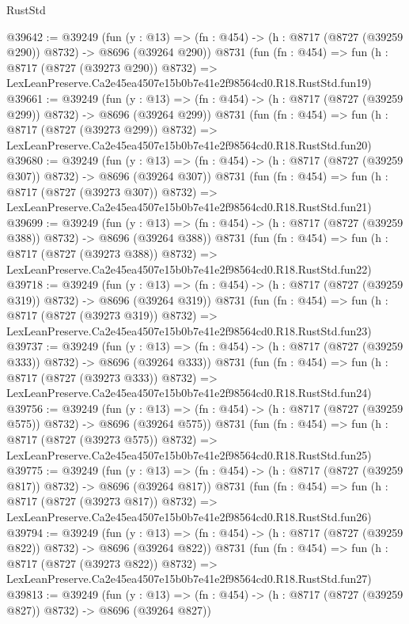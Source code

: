 \begin{lexlean}{RustStd}
\begin{coremodule}
@39642 := @39249
    (fun (y : @13) => (fn : @454) -> (h : @8717 (@8727 (@39259 @290)) @8732) -> @8696 (@39264 @290))
    @8731
    (fun (fn : @454) =>
    fun (h : @8717 (@8727 (@39273 @290)) @8732) =>
    LexLeanPreserve.Ca2e45ea4507e15b0b7e41e2f98564cd0.R18.RustStd.fun19)
@39661 := @39249
    (fun (y : @13) => (fn : @454) -> (h : @8717 (@8727 (@39259 @299)) @8732) -> @8696 (@39264 @299))
    @8731
    (fun (fn : @454) =>
    fun (h : @8717 (@8727 (@39273 @299)) @8732) =>
    LexLeanPreserve.Ca2e45ea4507e15b0b7e41e2f98564cd0.R18.RustStd.fun20)
@39680 := @39249
    (fun (y : @13) => (fn : @454) -> (h : @8717 (@8727 (@39259 @307)) @8732) -> @8696 (@39264 @307))
    @8731
    (fun (fn : @454) =>
    fun (h : @8717 (@8727 (@39273 @307)) @8732) =>
    LexLeanPreserve.Ca2e45ea4507e15b0b7e41e2f98564cd0.R18.RustStd.fun21)
@39699 := @39249
    (fun (y : @13) => (fn : @454) -> (h : @8717 (@8727 (@39259 @388)) @8732) -> @8696 (@39264 @388))
    @8731
    (fun (fn : @454) =>
    fun (h : @8717 (@8727 (@39273 @388)) @8732) =>
    LexLeanPreserve.Ca2e45ea4507e15b0b7e41e2f98564cd0.R18.RustStd.fun22)
@39718 := @39249
    (fun (y : @13) => (fn : @454) -> (h : @8717 (@8727 (@39259 @319)) @8732) -> @8696 (@39264 @319))
    @8731
    (fun (fn : @454) =>
    fun (h : @8717 (@8727 (@39273 @319)) @8732) =>
    LexLeanPreserve.Ca2e45ea4507e15b0b7e41e2f98564cd0.R18.RustStd.fun23)
@39737 := @39249
    (fun (y : @13) => (fn : @454) -> (h : @8717 (@8727 (@39259 @333)) @8732) -> @8696 (@39264 @333))
    @8731
    (fun (fn : @454) =>
    fun (h : @8717 (@8727 (@39273 @333)) @8732) =>
    LexLeanPreserve.Ca2e45ea4507e15b0b7e41e2f98564cd0.R18.RustStd.fun24)
@39756 := @39249
    (fun (y : @13) => (fn : @454) -> (h : @8717 (@8727 (@39259 @575)) @8732) -> @8696 (@39264 @575))
    @8731
    (fun (fn : @454) =>
    fun (h : @8717 (@8727 (@39273 @575)) @8732) =>
    LexLeanPreserve.Ca2e45ea4507e15b0b7e41e2f98564cd0.R18.RustStd.fun25)
@39775 := @39249
    (fun (y : @13) => (fn : @454) -> (h : @8717 (@8727 (@39259 @817)) @8732) -> @8696 (@39264 @817))
    @8731
    (fun (fn : @454) =>
    fun (h : @8717 (@8727 (@39273 @817)) @8732) =>
    LexLeanPreserve.Ca2e45ea4507e15b0b7e41e2f98564cd0.R18.RustStd.fun26)
@39794 := @39249
    (fun (y : @13) => (fn : @454) -> (h : @8717 (@8727 (@39259 @822)) @8732) -> @8696 (@39264 @822))
    @8731
    (fun (fn : @454) =>
    fun (h : @8717 (@8727 (@39273 @822)) @8732) =>
    LexLeanPreserve.Ca2e45ea4507e15b0b7e41e2f98564cd0.R18.RustStd.fun27)
@39813 := @39249
    (fun (y : @13) => (fn : @454) -> (h : @8717 (@8727 (@39259 @827)) @8732) -> @8696 (@39264 @827))

\end{coremodule}
\end{lexlean}
